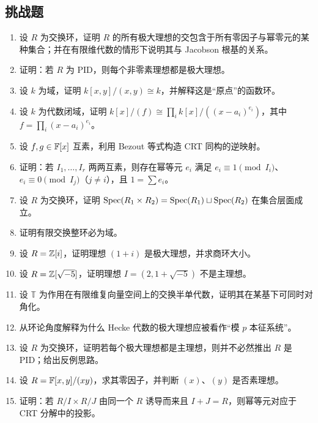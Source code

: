 \subsection*{挑战题}
\begin{enumerate}[resume, label=\textbf{\arabic*.}, leftmargin=*, itemsep=0.5em]
\item \hard 设 $R$ 为交换环，证明 $R$ 的所有极大理想的交包含于所有零因子与幂零元的某种集合；并在有限维代数的情形下说明其与 Jacobson 根基的关系。
\item \hard 证明：若 $R$ 为 PID，则每个非零素理想都是极大理想。
\item \hard 设 $k$ 为域，证明 $k[x,y]/(x,y)\cong k$，并解释这是“原点”的函数环。
\item \hard 设 $k$ 为代数闭域，证明 $k[x]/(f)\cong \prod_i k[x]/((x-a_i)^{e_i})$，其中 $f=\prod_i (x-a_i)^{e_i}$。
\item \hard 设 $f,g\in \mathbb{F}[x]$ 互素，利用 Bezout 等式构造 CRT 同构的逆映射。
\item \hard 证明：若 $I_1,\dots,I_r$ 两两互素，则存在幂等元 $e_i$ 满足 $e_i\equiv1\pmod{I_i}$、$e_i\equiv0\pmod{I_j}$（$j\ne i$），且 $1=\sum e_i$。
\item \hard 设 $R$ 为交换环，证明 $\mathrm{Spec}(R_1\times R_2)=\mathrm{Spec}(R_1)\sqcup \mathrm{Spec}(R_2)$ 在集合层面成立。
\item \hard 证明有限交换整环必为域。
\item \hard 设 $R=\mathbb{Z}[i]$，证明理想 $(1+i)$ 是极大理想，并求商环大小。
\item \hard 设 $R=\mathbb{Z}[\sqrt{-5}]$，证明理想 $I=(2,1+\sqrt{-5})$ 不是主理想。
\item \hard 设 $\mathbb{T}$ 为作用在有限维复向量空间上的交换半单代数，证明其在某基下可同时对角化。
\item \hard 从环论角度解释为什么 Hecke 代数的极大理想应被看作“模 $p$ 本征系统”。
\item \hard 设 $R$ 为交换环，证明若每个极大理想都是主理想，则并不必然推出 $R$ 是 PID；给出反例思路。
\item \hard 设 $R=\mathbb{F}[x,y]/(xy)$，求其零因子，并判断 $(x)$、$(y)$ 是否素理想。
\item \hard 证明：若 $R/I\times R/J$ 由同一个 $R$ 诱导而来且 $I+J=R$，则幂等元对应于 CRT 分解中的投影。
\end{enumerate}
